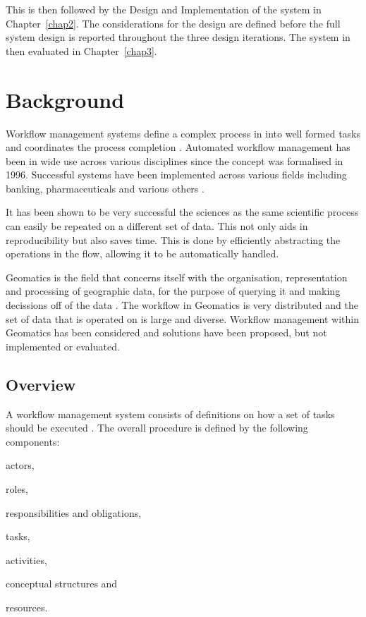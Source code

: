 \documentclass[12pt,a4paper]{report}
\begin{document}
    This is then followed by the Design and Implementation of the system
    in Chapter~\ref{chap2}. The considerations for the design are defined
    before the full system design is reported throughout the three design
    iterations.  The system in then evaluated in Chapter~\ref{chap3}.


\chapter{Background\label{chap1}}
    Workflow management systems define a complex process in into well formed
    tasks and coordinates the process completion \cite{1245778}.  Automated
    workflow management has been in wide use across various disciplines since
    the concept was formalised in 1996\cite{springerlink:10.1007/BF00136712}.
    Successful systems have been implemented across various fields including
    banking, pharmaceuticals and various others
    \cite{Brahe:2007:SWW:1316624.1316661,5407993}.

    It has been shown to be very successful the sciences as the same scientific
    process can easily be repeated on a different set of data\cite{4721191}.
    This not only aids in reproducibility but also saves time.  This is done by
    efficiently abstracting the operations in the flow, allowing it to be
    automatically handled.

    Geomatics is the field that concerns itself with the organisation,
    representation and processing of geographic data, for the purpose of
    querying it and making decissions off of the data
    \cite{DiMartino:2007:TAG:1341012.1341081}. The workflow in Geomatics is
    very distributed and the set of data that is operated on is large and
    diverse.  Workflow management within Geomatics has been considered and
    solutions have been proposed, but not implemented or
    evaluated\cite{Migliorini:2011:WTG:1999320.1999356}.


\section{Overview}
A workflow management system consists of definitions on how a set of tasks
should be executed \cite{springerlink:10.1007/BF00136712,vanderAalst2002125}.
The overall procedure is defined by the following components:
\begin{inparaenum}[(i)] \item actors, \item roles, \item responsibilities and
obligations, \item tasks, \item activities,\item conceptual structures and
\item resources.\end{inparaenum}
\end{document}
